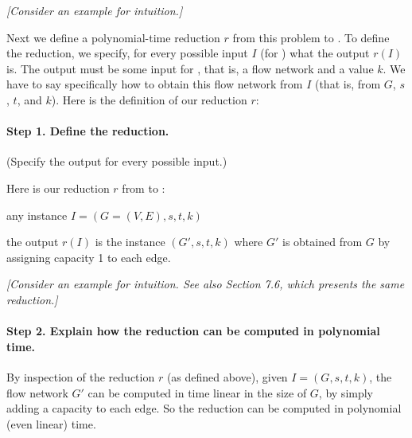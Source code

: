 \emph{[Consider an example for intuition.]}

Next we define a polynomial-time reduction $r$ from this problem to .
To define the reduction, we specify, for every possible input $I$ (for )
what the output $r(I)$ is.  The output must be some input for , that is, a flow network and a value $k$.
We have to say specifically how to obtain this flow network from $I$ (that is, from $G$, $s$, $t$, and $k$).
Here is the definition of our reduction $r$:

\paragraph{Step 1.  Define the reduction.} (Specify the output for every possible input.)

\begin{mylist}
\item[] Here is our reduction $r$ from  to :
\item[\bf input:] any  instance $I=(G=(V ,E), s, t, k)$
\item[\bf output:] the output $r(I)$ is the  instance $(G', s, t, k)$ where
  $G'$ is obtained from $G$ by assigning capacity 1 to each edge.
\end{mylist}

\emph{[Consider an example for intuition.  See also \KT Section 7.6, which presents the same reduction.]}

\paragraph{Step 2.  Explain how the reduction can be computed in polynomial time.}
By inspection of the reduction $r$ (as defined above), given $I=(G, s, t, k)$, 
the flow network $G'$ can be computed in time linear in the size of $G$,
by simply adding a capacity to each edge.
So the reduction can be computed in polynomial (even linear) time.

